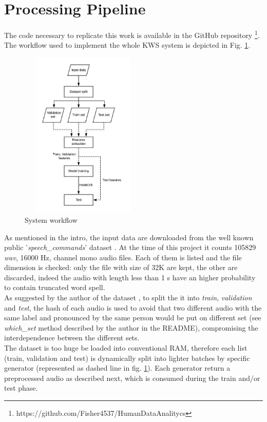 \section{Processing Pipeline}
\label{sec:processing_pipeine}

\noindent The code necessary to replicate this work is available in the GitHub repository \footnote{https://github.com/Fisher4537/HumanDataAnalitycs}.\\
The workflow used to implement the whole KWS system is depicted in Fig. \ref{fig:pipeline}.
\begin{figure}[h]
			\centering
	    	\includegraphics[width=6cm, height=8cm ,width=0.25\textwidth]{pipeline}
	    	\caption{System workflow}
	    	\label{fig:pipeline}
\end{figure} 
\noindent As mentioned in the intro, the input data are downloaded from the well known public '{\it{speech\_commands}}' dataset \cite{Warden-2018}. At the time of this project it counts 105829 \textit{wav}, 16000 Hz, channel mono audio files. Each of them is listed and the file dimension is checked: only the file with size of 32K are kept, the other are discarded, indeed the audio with length less than 1 s have an higher probability to contain truncated word spell. \\
As suggested by the author of the dataset \cite{Warden-2018}, to split the it into \textit{train}, \textit{validation} and \textit{test}, the hash of each audio is used to avoid that two different audio with the same label and pronounced by the same person would be put on different set (see \textit{which\_set} method described by the author in the README), compromising the interdependence between the different sets. \\
The dataset is too huge be loaded into conventional RAM, therefore each list (train, validation and test) is dynamically split into lighter batches by specific generator (represented as dashed line in fig. \ref{fig:pipeline}). Each generator return a preprocessed audio as described next, which is consumed during the train and/or test phase.\\
